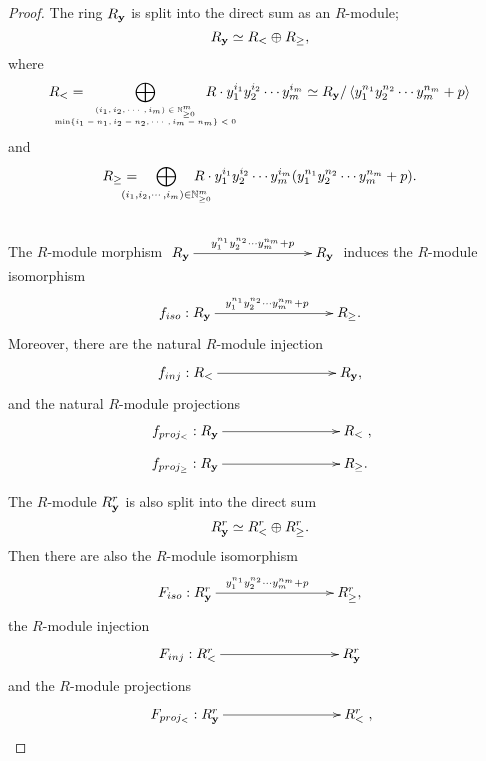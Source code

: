 \documentclass[10pt]{amsart}
\theoremstyle{break}
\begin{document}
\begin{proof}
\indent
The ring $R_{\bf y}$ is split into the direct sum as an $R$-module;
$$
R_{\bf y} \simeq R_{<} \oplus R_{\geq},
$$
where 
$$
\displaystyle R_{<}= \hspace{-1cm}\bigoplus_{\tiny \begin{array}{c}(i_1,i_2,\cdots ,i_m) \in {{\mathbb{N}}}_{\geq 0}^m \\ \min \{ i_1-n_1,i_2-n_2,\cdots ,i_m-n_m \} < 0 \end{array}} \hspace{-1cm}R\cdot y_1^{i_1}y_2^{i_2}\cdots y_m^{i_m} \simeq R_{\bf y}/\left<y_1^{n_1}y_2^{n_2}\cdots y_m^{n_m} + p\right>
$$ 
and 
$$
\displaystyle R_{\geq }=\hspace{-0.5cm}\bigoplus_{(i_1,i_2,\cdots ,i_m) \in {{\mathbb{N}}}_{\geq 0}^m} \hspace{-0.5cm}R \cdot y_1^{i_1}y_2^{i_2}\cdots y_m^{i_m} (y_1^{n_1}y_2^{n_2}\cdots y_m^{n_m} + p) .
$$\\
The $R$-module morphism $\xymatrix{R_{\bf y} \ar[rrr]^{y_1^{n_1}y_2^{n_2}\cdots y_m^{n_m} + p}&&& R_{\bf y}}$ induces the $R$-module isomorphism
$$
\xymatrix{
f_{iso}:R_{\bf y} \ar[rrr]^{y_1^{n_1}y_2^{n_2}\cdots y_m^{n_m} + p} &&& R_{\geq }.
}
$$
Moreover, there are the natural $R$-module injection
$$
\xymatrix{
f_{inj}:R_{<} \ar[rrr] &&& R_{\bf y},
}
$$
and the natural $R$-module projections
$$
\xymatrix{
f_{proj_{<}}:R_{\bf y} \ar[rrr] &&& R_{<}
},
$$
$$
\xymatrix{
f_{proj_{\geq }}:R_{\bf y} \ar[rrr] &&& R_{\geq }.
}
$$

\indent
The $R$-module $R_{\bf y}^r$ is also split into the direct sum 
$$
R_{\bf y}^r \simeq R_{<}^r \oplus R_{\geq }^r.
$$
Then there are also the $R$-module isomorphism
$$
\xymatrix{
F_{iso}:R_{\bf y}^r \ar[rrr]^{y_1^{n_1}y_2^{n_2}\cdots y_m^{n_m} + p} &&& R_{\geq }^r,
}
$$
the $R$-module injection
$$
\xymatrix{
F_{inj}:R_{<}^r \ar[rrr] &&& R_{\bf y}^r
}
$$
and the $R$-module projections
$$
\xymatrix{
F_{proj_{<}}:R_{\bf y}^r \ar[rrr] &&& R_{<}^r
},
$$


\end{proof}
\end{document}
